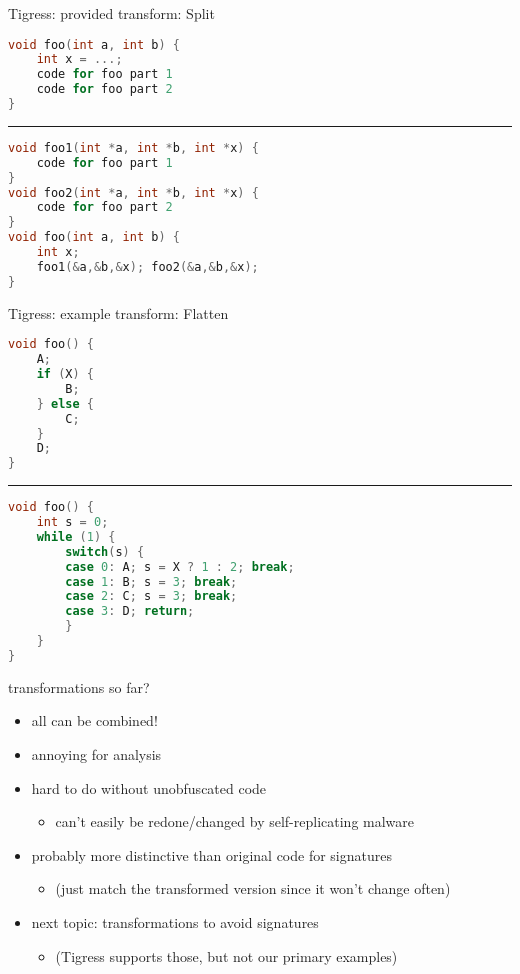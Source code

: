 \begin{frame}[fragile,label=TigressSplit]{Tigress: provided transform: Split}
\begin{lstlisting}[language=C++,style=smaller]
void foo(int a, int b) {
    int x = ...;
    code for foo part 1
    code for foo part 2
}
\end{lstlisting}
\hrule
\begin{lstlisting}[language=C++,style=smaller]
void foo1(int *a, int *b, int *x) {
    code for foo part 1
}
void foo2(int *a, int *b, int *x) {
    code for foo part 2
}
void foo(int a, int b) {
    int x;
    foo1(&a,&b,&x); foo2(&a,&b,&x);
}
\end{lstlisting}
\end{frame}

\begin{frame}[fragile,label=TigressFlatten]{Tigress: example transform: Flatten}
\begin{lstlisting}[language=C++,style=size10]
void foo() {
    A;
    if (X) {
        B;
    } else {
        C;
    }
    D;
}
\end{lstlisting}
\hrule
\begin{lstlisting}[language=C++,style=size10]
void foo() {
    int s = 0;
    while (1) { 
        switch(s) {
        case 0: A; s = X ? 1 : 2; break;
        case 1: B; s = 3; break;
        case 2: C; s = 3; break;
        case 3: D; return;
        }
    }
}
\end{lstlisting}
\end{frame}

\begin{frame}{transformations so far?}
    \begin{itemize}
    \item all can be combined!
    \item annoying for analysis
    \item hard to do without unobfuscated code
        \begin{itemize}
        \item can't easily be redone/changed by self-replicating malware
        \end{itemize}
    \item probably more distinctive than original code for signatures
        \begin{itemize}
        \item (just match the transformed version since it won't change often)
        \end{itemize}
    \vspace{.5cm}
    \item next topic: transformations to avoid signatures
        \begin{itemize}
        \item (Tigress supports those, but not our primary examples)
        \end{itemize}
    \end{itemize}
\end{frame}
